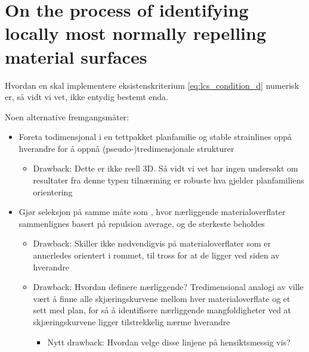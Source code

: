 \section{On the process of identifying locally most normally repelling material
surfaces}
\label{sec:on_the_process_of_identifying_locally_most_normally_repelling_material_surfaces}

\begin{framed}
    Hvordan en skal implementere eksistenskriterium \eqref{eq:lcs_condition_d}
    numerisk er, så vidt vi vet, ikke entydig bestemt enda.

    Noen alternative fremgangsmåter:
    \begin{itemize}
        \item Foreta todimensjonal i en tettpakket planfamilie og stable
            strainlines oppå hverandre for å oppnå (pseudo-)tredimensjonale
            strukturer
            \begin{itemize}
                \item Drawback: Dette er ikke reell 3D. Så vidt vi vet har
                    ingen undersøkt om resultater fra denne typen tilnærming er
                    robuste hva gjelder planfamiliens orientering
            \end{itemize}
        \item Gjør seleksjon på samme måte som
            \textcite{farazmand2012computing}, hvor nærliggende
            materialoverflater sammenlignes basert på repulsion average, og
            de sterkeste beholdes
            \begin{itemize}
                \item Drawback: Skiller ikke nødvendigvis på materialoverflater
                    som er annerledes orientert i rommet, til tross for at de
                    ligger ved siden av hverandre
                \item Drawback: Hvordan definere nærliggende? Tredimensional
                    analogi av \textcite{farazmand2012computing} ville vært å
                    finne alle skjæringskurvene mellom hver materialoverflate
                    og et sett med plan, for så å identifisere nærliggende
                    mangfoldigheter ved at skjæringskurvene ligger
                    tilstrekkelig nærme hverandre
                    \begin{itemize}
                        \item Nytt drawback: Hvordan velge disse linjene på
                            hensiktsmessig vis?

\end{itemize}
\end{itemize}
\end{itemize}
\end{framed}
